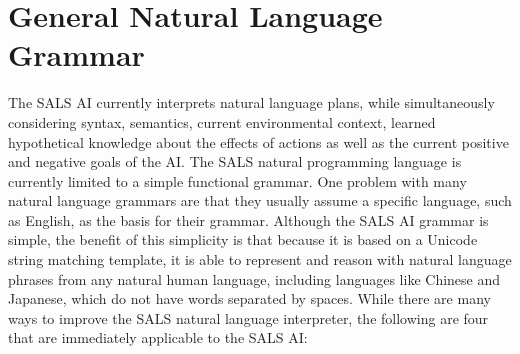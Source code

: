 \section{General Natural Language Grammar}

The SALS AI currently interprets natural language plans, while
simultaneously considering syntax, semantics, current environmental
context, learned hypothetical knowledge about the effects of actions
as well as the current positive and negative goals of the AI.  The
SALS natural programming language is currently limited to a simple
functional grammar.  One problem with many natural language grammars
are that they usually assume a specific language, such as English, as
the basis for their grammar.  Although the SALS AI grammar is simple,
the benefit of this simplicity is that because it is based on a
Unicode string matching template, it is able to represent and reason
with natural language phrases from any natural human language,
including languages like Chinese and Japanese, which do not have words
separated by spaces.  While there are many ways to improve the SALS
natural language interpreter, the following are four that are
immediately applicable to the SALS AI:
